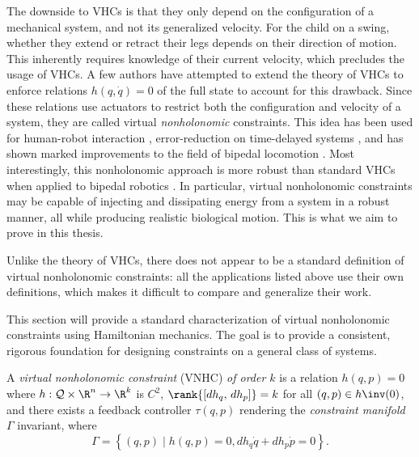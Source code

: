 The downside to VHCs is that they only depend on the configuration of a
mechanical system, and not its generalized velocity.
For the child on a swing, whether they extend or retract their legs
depends on their direction of motion. 
This inherently requires knowledge of their current velocity, which precludes
the usage of VHCs. 
A few authors have attempted to extend the theory of VHCs to enforce relations
\(h(q,\dot{q}) = 0\) of the full state to account for this drawback. 
Since these relations use actuators to restrict both the configuration and
velocity of a system, they are called virtual \textit{nonholonomic} constraints.
This idea has been used for human-robot interaction
\cite{vnhc_human_robot_cooperation,psd_based_vnhc_redundant_manipulator,haptic_vnhc},
error-reduction on time-delayed systems \cite{vnhc_time_delay_teleop},
and has shown marked improvements to the field of bipedal locomotion 
\cite{nhvc_dynamic_walking,
hybrid_zero_dynamics_bipedal_nhvcs,output_nhvc_bipedal_control}.
Most interestingly, this nonholonomic approach is more robust
than standard VHCs when applied to bipedal robotics \cite{nhvc_incline_walking}.
In particular, virtual nonholonomic constraints may be capable of injecting and
dissipating energy from a system in a robust manner, all while producing
realistic biological motion. This is what we aim to prove in this thesis.

Unlike the theory of VHCs, there does not appear to be a standard definition of
virtual nonholonomic constraints: 
all the applications listed above use their own definitions, which makes it
difficult to compare and generalize their work. 

This section will provide a standard characterization of virtual nonholonomic
constraints using Hamiltonian mechanics. 
The goal is to provide a consistent, rigorous foundation for designing
constraints on a general class of systems.

\begin{defn}
    A \textit{virtual nonholonomic constraint} (VNHC) \textit{of order \(k\)} is a
    relation \(h(q,p) = 0\) where \(h : \mathcal{Q}\times\R^n \rightarrow \R^k\) is
    \(C^2\), \(\rank{\left[ dh_q,\, dh_p \right]} = k\) for all 
    \((q,p) \in h\inv(0)\), and there exists a feedback controller \(\tau(q,p)\)
    rendering the \textit{constraint manifold} \(\Gamma\) invariant,
    where
    \[
        \Gamma = \left\{(q,p) \mid h(q,p) = 0, dh_q \dot{q} + dh_p \dot{p} = 0\right\}
        .
    \]
\end{defn}

